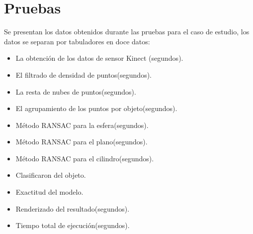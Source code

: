 
\section{Pruebas}\label{A:pruebas}

Se presentan los datos obtenidos durante las pruebas para el caso de estudio, los datos se separan por tabuladores en doce datos:
\begin{itemize}
	\item  La obtención de los datos de sensor Kinect (segundos).\\
	\item  El filtrado de densidad de puntos(segundos).\\
	\item  La resta de nubes de puntos(segundos).\\
	\item  El agrupamiento de los puntos por objeto(segundos).\\
	\item  Método RANSAC para la esfera(segundos).\\
	\item  Método RANSAC para el plano(segundos).\\
	\item  Método RANSAC para el cilindro(segundos).\\
	\item  Clasificaron del objeto.
	\item  Exactitud del modelo.
	\item  Renderizado del resultado(segundos).\\
	\item  Tiempo total de ejecución(segundos).\\

\end{itemize}


